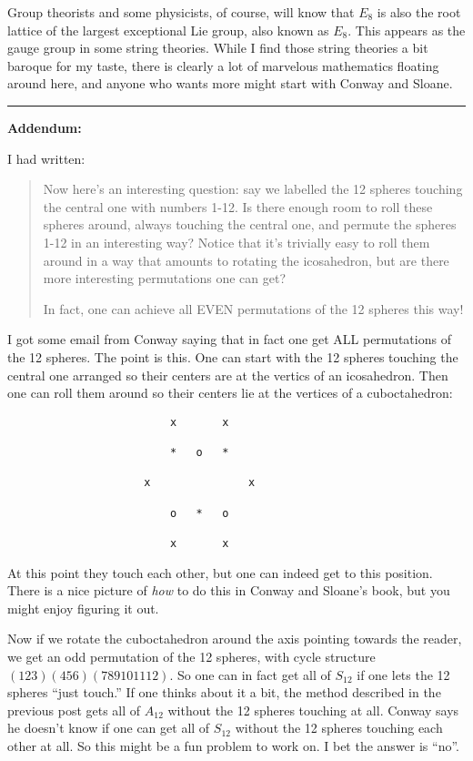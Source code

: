 \documentclass{article}
\begin{document}
Group theorists and some physicists, of course, will know that \(E_8\)
is also the root lattice of the largest exceptional Lie group, also
known as \(E_8\). This appears as the gauge group in some string
theories. While I find those string theories a bit baroque for my taste,
there is clearly a lot of marvelous mathematics floating around here,
and anyone who wants more might start with Conway and Sloane.

\begin{center}\rule{0.5\linewidth}{0.5pt}\end{center}

\textbf{Addendum:}

I had written:

\begin{quote}
Now here's an interesting question: say we labelled the 12 spheres
touching the central one with numbers 1-12. Is there enough room to roll
these spheres around, always touching the central one, and permute the
spheres 1-12 in an interesting way? Notice that it's trivially easy to
roll them around in a way that amounts to rotating the icosahedron, but
are there more interesting permutations one can get?

In fact, one can achieve all EVEN permutations of the 12 spheres this
way!
\end{quote}

I got some email from Conway saying that in fact one get ALL
permutations of the 12 spheres. The point is this. One can start with
the 12 spheres touching the central one arranged so their centers are at
the vertics of an icosahedron. Then one can roll them around so their
centers lie at the vertices of a cuboctahedron:

\begin{verbatim}
                         x       x   

                         *   o   * 
 
                     x               x

                         o   *   o

                         x       x
\end{verbatim}

At this point they touch each other, but one can indeed get to this
position. There is a nice picture of \emph{how} to do this in Conway and
Sloane's book, but you might enjoy figuring it out.

Now if we rotate the cuboctahedron around the axis pointing towards the
reader, we get an odd permutation of the 12 spheres, with cycle
structure \((1 2 3)(4 5 6)(7 8 9 10 11 12)\). So one can in fact get all
of \(S_{12}\) if one lets the 12 spheres ``just touch.'' If one thinks
about it a bit, the method described in the previous post gets all of
\(A_{12}\) without the 12 spheres touching at all. Conway says he
doesn't know if one can get all of \(S_{12}\) without the 12 spheres
touching each other at all. So this might be a fun problem to work on. I
bet the answer is ``no''.
\end{document}
